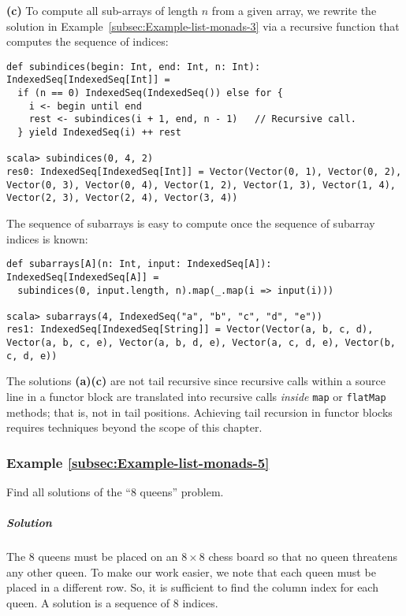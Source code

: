 \textbf{(c)} To compute all sub-arrays of length $n$ from a given
array, we rewrite the solution in Example~\ref{subsec:Example-list-monads-3}
via a recursive function that computes the sequence of indices:
\begin{lstlisting}
def subindices(begin: Int, end: Int, n: Int): IndexedSeq[IndexedSeq[Int]] =
  if (n == 0) IndexedSeq(IndexedSeq()) else for {
    i <- begin until end
    rest <- subindices(i + 1, end, n - 1)   // Recursive call.
  } yield IndexedSeq(i) ++ rest

scala> subindices(0, 4, 2)
res0: IndexedSeq[IndexedSeq[Int]] = Vector(Vector(0, 1), Vector(0, 2), Vector(0, 3), Vector(0, 4), Vector(1, 2), Vector(1, 3), Vector(1, 4), Vector(2, 3), Vector(2, 4), Vector(3, 4))
\end{lstlisting}
The sequence of subarrays is easy to compute once the sequence of
subarray indices is known: 
\begin{lstlisting}
def subarrays[A](n: Int, input: IndexedSeq[A]): IndexedSeq[IndexedSeq[A]] =
  subindices(0, input.length, n).map(_.map(i => input(i)))

scala> subarrays(4, IndexedSeq("a", "b", "c", "d", "e"))
res1: IndexedSeq[IndexedSeq[String]] = Vector(Vector(a, b, c, d), Vector(a, b, c, e), Vector(a, b, d, e), Vector(a, c, d, e), Vector(b, c, d, e))
\end{lstlisting}

The solutions \textbf{(a)}\textendash \textbf{(c)} are not tail recursive
since recursive calls within a source line in a functor block are
translated into recursive calls \emph{inside} \lstinline!map! or
\lstinline!flatMap! methods; that is, not in tail positions. Achieving
tail recursion in functor blocks requires techniques beyond the scope
of this chapter.

\subsubsection{Example \label{subsec:Example-list-monads-5}\ref{subsec:Example-list-monads-5}}

Find all solutions of the \textsf{``}$8$ queens\textsf{''} problem.

\subparagraph{Solution}

The $8$ queens must be placed on an $8\times8$ chess board so that
no queen threatens any other queen. To make our work easier, we note
that each queen must be placed in a different row. So, it is sufficient
to find the column index for each queen. A solution is a sequence
of $8$ indices.

